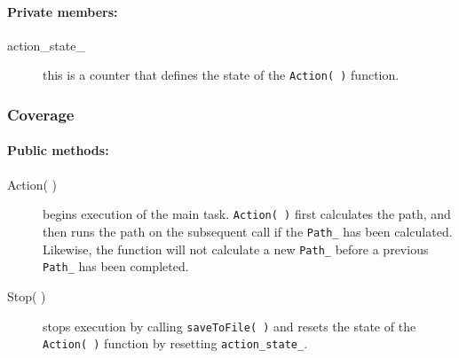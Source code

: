 \paragraph{Private members:}
\begin{adjustwidth}{2.5em}{0pt}\begin{description}
		\item [action_state_] this is a counter that defines the state of the \texttt{Action( )} function.
\end{description}\end{adjustwidth}

\subsubsection{Coverage}

\paragraph{Public methods:}
\begin{adjustwidth}{2.5em}{0pt}\begin{description}
		\item [Action( )] begins execution of the main task. \texttt{Action( )} first calculates the path, and then runs the path on the subsequent call if the \texttt{Path_} has been calculated. Likewise, the function will not calculate a new \texttt{Path_} before a previous \texttt{Path_} has been completed. 
		\item [Stop( )] stops execution by calling \texttt{saveToFile( )} and resets the state of the \texttt{Action( )} function by resetting \texttt{action_state_}.
\end{description}\end{adjustwidth}

